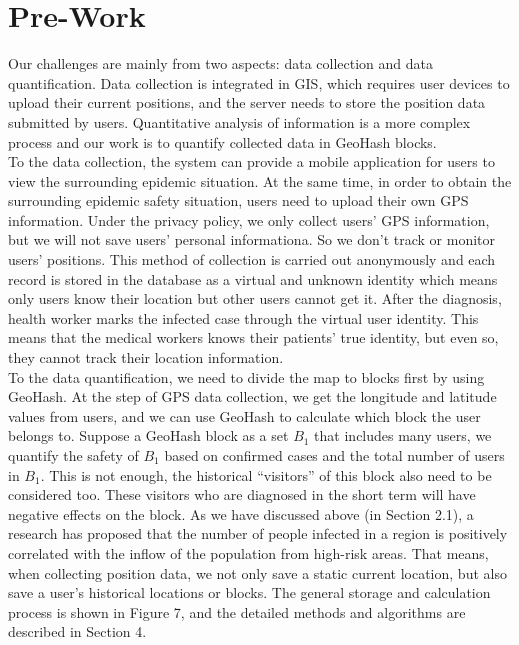 \documentclass[sigplan,screen]{acmart}
\begin{document}
\section{Pre-Work}
Our challenges are mainly from two aspects: data collection and data quantification.
Data collection is integrated in GIS, which requires user devices to upload their current positions, and the server needs to store the position data submitted by users.
Quantitative analysis of information is a more complex process and our work is to quantify collected data in GeoHash blocks.
\\
To the data collection, the system can provide a mobile application for users to view the surrounding epidemic situation.
At the same time, in order to obtain the surrounding epidemic safety situation, users need to upload their own GPS information.
Under the privacy policy, we only collect users' GPS information, but we will not save users' personal informationa. So we don't track or monitor users' positions.
This method of collection is carried out anonymously and each record is stored in the database as a virtual and unknown identity which means only users know their location but other users cannot get it.
After the diagnosis, health worker marks the infected case through the virtual user identity.
This means that the medical workers knows their patients' true identity, but even so, they cannot track their location information.
\\
To the data quantification, we need to divide the map to blocks first by using GeoHash.
At the step of GPS data collection, we get the longitude and latitude values from users, and we can use GeoHash to calculate which block the user belongs to.
Suppose a GeoHash block as a set $B_1$ that includes many users, we quantify the safety of $B_1$ based on confirmed cases and the total number of users in $B_1$.
This is not enough, the historical ``visitors'' of this block also need to be considered too.
These visitors who are diagnosed in the short term will have negative effects on the block.
As we have discussed above (in Section 2.1), a research has proposed that the number of people infected in a region is positively correlated with the inflow of the population from high-risk areas.
That means, when collecting position data, we not only save a static current location, but also save a user's historical locations or blocks.
The general storage and calculation process is shown in Figure 7, and the detailed methods and algorithms are described in Section 4.
\end{document}
